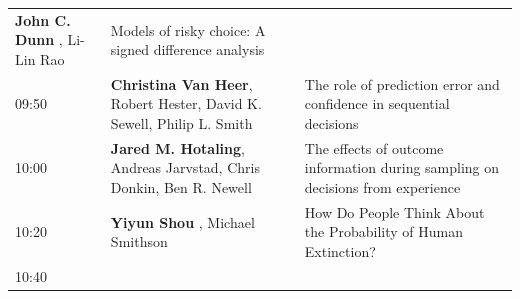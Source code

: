 \documentclass[]{article}
\begin{document}
\begin{longtable}[]{@{}lll@{}}
\begin{minipage}[t]{0.38\columnwidth}
\textbf{John C. Dunn} , Li-Lin Rao\strut
\end{minipage} & \begin{minipage}[t]{0.51\columnwidth}\raggedright\strut
Models of risky choice: A signed difference analysis\strut
\end{minipage}\tabularnewline
\begin{minipage}[t]{0.03\columnwidth}\raggedright\strut
09:50\strut
\end{minipage} & \begin{minipage}[t]{0.38\columnwidth}\raggedright\strut
\textbf{Christina Van Heer}, Robert Hester, David K. Sewell, Philip L.
Smith\strut
\end{minipage} & \begin{minipage}[t]{0.51\columnwidth}\raggedright\strut
The role of prediction error and confidence in sequential
decisions\strut
\end{minipage}\tabularnewline
\begin{minipage}[t]{0.03\columnwidth}\raggedright\strut
10:00\strut
\end{minipage} & \begin{minipage}[t]{0.38\columnwidth}\raggedright\strut
\textbf{Jared M. Hotaling}, Andreas Jarvstad, Chris Donkin, Ben R.
Newell\strut
\end{minipage} & \begin{minipage}[t]{0.51\columnwidth}\raggedright\strut
The effects of outcome information during sampling on decisions from
experience\strut
\end{minipage}\tabularnewline
\begin{minipage}[t]{0.03\columnwidth}\raggedright\strut
10:20\strut
\end{minipage} & \begin{minipage}[t]{0.38\columnwidth}\raggedright\strut
\textbf{Yiyun Shou} , Michael Smithson\strut
\end{minipage} & \begin{minipage}[t]{0.51\columnwidth}\raggedright\strut
How Do People Think About the Probability of Human Extinction?\strut
\end{minipage}\tabularnewline
\begin{minipage}[t]{0.03\columnwidth}\raggedright\strut
10:40\strut
\end{minipage} & \begin{minipage}[t]{0.38\columnwidth}\raggedright\strut
\strut
\end{minipage} & \begin{minipage}[t]{0.51\columnwidth}\raggedright\strut

\end{minipage}
\end{longtable}
\end{document}
